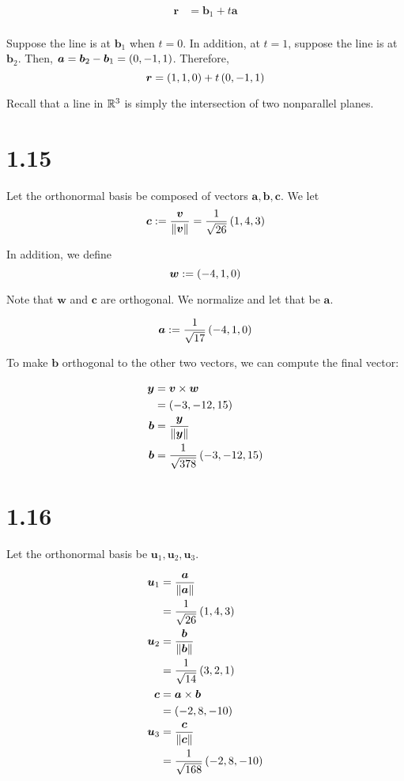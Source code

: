 \documentclass{article}
\begin{document}
\begin{align*}
  \bm{r} &= \bm{b}_1 + t \bm{a} \\
\end{align*}

Suppose the line is at $\bm{b}_1$ when $t=0$.
In addition, at $t=1$, suppose the line is at $\bm{b}_2$.
Then, $\bm{a} = \bm{b}_2 - \bm{b}_1 = \left ( 0, -1, 1 \right)$.
Therefore,
$$
\bm{r} = \left ( 1, 1, 0 \right) + t \left ( 0, -1, 1 \right)
$$

Recall that a line in $\mathbb R^3$ is simply the intersection of two nonparallel planes.


\section*{1.15}
Let the orthonormal basis be composed of vectors $\bm{a}, \bm{b}, \bm{c}$.
We let
$$\bm{c} := \frac{\bm{v}}{\left\lVert\bm{v}\right\rVert} = \frac{1}{\sqrt{26}} \left ( 1, 4, 3 \right)$$

In addition, we define
$$
\bm{w} := \left ( -4, 1, 0 \right)
$$

Note that $\bm{w}$ and $\bm{c}$ are orthogonal.
We normalize and let that be $\bm{a}$.

$$
\bm{a} := \frac{1}{\sqrt{17}} \left ( -4, 1, 0 \right)
$$

To make $\bm{b}$ orthogonal to the other two vectors, we can compute the final vector:

\begin{align*}
  \bm{y} &= \bm{v} \times \bm{w} \\
         &= \left ( -3, -12, 15 \right) \\
  \bm{b} &= \frac{\bm{y}}{\left\lVert\bm{y}\right\rVert} \\
  \bm{b} &= \frac{1}{\sqrt{378}} \left ( -3, -12, 15 \right) \\
\end{align*}


\section*{1.16}

Let the orthonormal basis be $\bm{u}_1, \bm{u}_2, \bm{u}_3$.

\begin{align*}
  \bm{u}_1 &= \frac{\bm{a}}{\left\lVert\bm{a}\right\rVert} \\
           &= \frac{1}{\sqrt{26}} \left ( 1, 4, 3 \right) \\
  \bm{u}_2 &= \frac{\bm{b}}{\left\lVert\bm{b}\right\rVert} \\
           &= \frac{1}{\sqrt{14}} \left ( 3, 2, 1 \right) \\
  \bm{c} &= \bm{a} \times \bm{b} \\
           &= \left ( -2, 8, -10 \right) \\
  \bm{u}_3 &= \frac{\bm{c}}{\left\lVert\bm{c}\right\rVert} \\
  &= \frac{1}{\sqrt{168}} \left ( -2, 8, -10 \right) \\
\end{align*}
\end{document}
